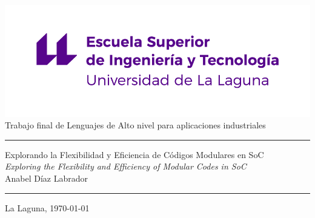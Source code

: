 \pagestyle{empty}
\thispagestyle{empty}


\newcommand{\HRule}{\rule{\linewidth}{1mm}}
\setlength{\parindent}{0mm}
\setlength{\parskip}{0mm}


\begin{center}
\includegraphics[scale=0.8]{figures/escuela-ingenieria-tecnologia-original}\\[10mm]
{\Huge Trabajo final de Lenguajes de Alto nivel para aplicaciones industriales}
\end{center}

\HRule
\begin{flushright}
        {\Huge Explorando la Flexibilidad y Eficiencia de Códigos Modulares en SoC} \\[2.5mm]
        {\Large \textit{Exploring the Flexibility and Efficiency of Modular Codes in SoC}} \\[5mm]
        {\Large Anabel Díaz Labrador} \\[5mm]


\end{flushright}
\HRule
{}
\begin{center}
  \Large La Laguna, \today
\end{center}

\setlength{\parindent}{5mm}